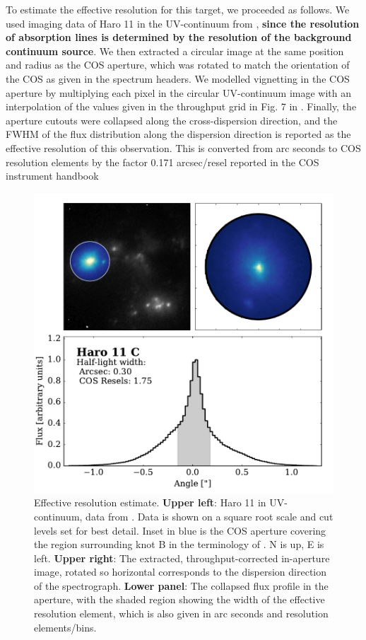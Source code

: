 \documentclass[twocolumn, trackchanges]{aastex61}
\begin{document}
To estimate the effective resolution for this target, we proceeded as
follows. We used imaging data of Haro 11 in the UV-continuum
from \citet{Ostlin2009, Hayes2009}, \textbf{since the resolution of absorption
lines is determined by the resolution of the background continuum source}. We 
then extracted a circular image at the same
position and radius as the COS aperture, which was rotated to match the
orientation of the COS as given in the spectrum headers. We modelled
vignetting in the COS aperture by multiplying each pixel in the circular
UV-continuum image with an interpolation of the values given in the
throughput grid in Fig. 7 in \citet{CosImaging}. Finally, the aperture
cutouts were collapsed along the cross-dispersion direction, and the
FWHM of the flux distribution along the dispersion direction is reported
as the effective resolution of this observation. This is converted from
arc seconds to COS resolution elements by the factor 0.171 arcsec/resel
reported in the COS instrument handbook \citep{CosHandbook}

\begin{figure}
\centering
\includegraphics[width=1.000\hsize]{./EffResol.pdf}
\caption{Effective resolution estimate. \textbf{Upper left}: Haro 11 in
UV-continuum, data from \citet{Ostlin2009, Hayes2009}. Data is
shown on a square root scale and cut levels set for best detail. Inset
in blue is the COS aperture covering the region surrounding knot
B in the terminology of \citet{Vader1993}. N is up, E is left.
\textbf{Upper right}: The extracted, throughput-corrected in-aperture
image, rotated so horizontal corresponds to the dispersion direction of
the spectrograph. \textbf{Lower panel}: The collapsed flux profile in
the aperture, with the shaded region showing the width of the effective
resolution element, which is also given in arc seconds and resolution
elements/bins.}\label{fig:resol}
\end{figure}
\end{document}
